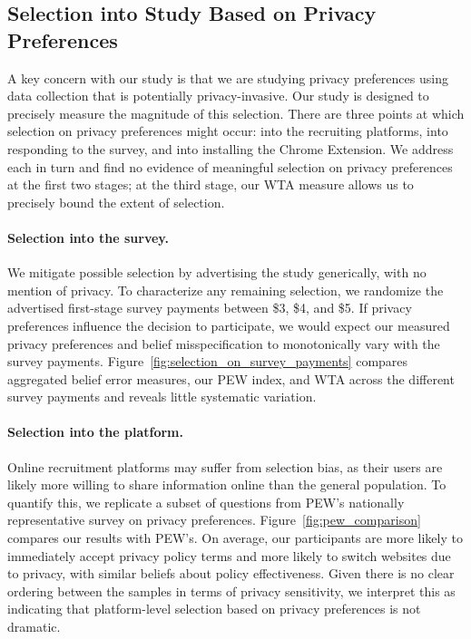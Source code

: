 \documentclass[12pt]{article}
\theoremstyle{definition}
\theoremstyle{remark}
\begin{document}
\subsection{Selection into Study Based on Privacy Preferences}\label{sec:selection}

A key concern with our study is that we are studying privacy preferences using data collection that is potentially privacy-invasive. Our study is designed to precisely measure the magnitude of this selection. There are three points at which selection on privacy preferences might occur: into the recruiting platforms, into responding to the survey, and into installing the Chrome Extension. We address each in turn and find no evidence of meaningful selection on privacy preferences at the first two stages; at the third stage, our WTA measure allows us to precisely bound the extent of selection.

\paragraph{Selection into the survey.} We mitigate possible selection by advertising the study generically, with no mention of privacy. To characterize any remaining selection, we randomize the advertised first-stage survey payments between \$3, \$4, and \$5. If privacy preferences influence the decision to participate, we would expect our measured privacy preferences and belief misspecification to monotonically vary with the survey payments. Figure~\ref{fig:selection_on_survey_payments} compares aggregated belief error measures, our PEW index, and WTA across the different survey payments and reveals little systematic variation.

\paragraph{Selection into the platform.} Online recruitment platforms may suffer from selection bias, as their users are likely more willing to share information online than the general population. To quantify this, we replicate a subset of questions from PEW's nationally representative survey on privacy preferences. Figure~\ref{fig:pew_comparison} compares our results with PEW's. On average, our participants are more likely to immediately accept privacy policy terms and more likely to switch websites due to privacy, with similar beliefs about policy effectiveness. Given there is no clear ordering between the samples in terms of privacy sensitivity, we interpret this as indicating that platform-level selection based on privacy preferences is not dramatic.
\end{document}

